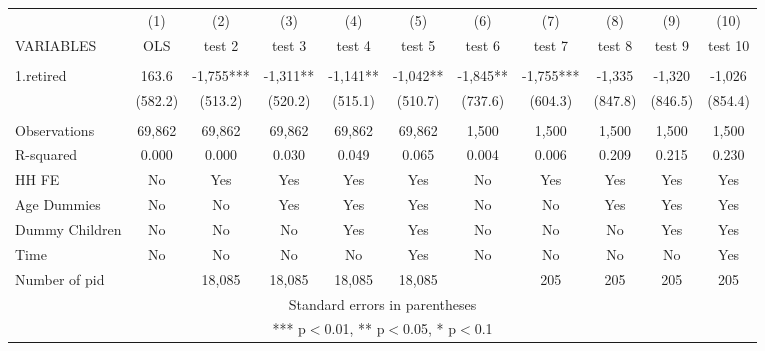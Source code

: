 \begin{tabular}{lcccccccccc} \hline
 & (1) & (2) & (3) & (4) & (5) & (6) & (7) & (8) & (9) & (10) \\
VARIABLES & OLS & test 2 & test 3 & test 4 & test 5 & test 6 & test 7 & test 8 & test 9 & test 10 \\ \hline
 &  &  &  &  &  &  &  &  &  &  \\
1.retired & 163.6 & -1,755*** & -1,311** & -1,141** & -1,042** & -1,845** & -1,755*** & -1,335 & -1,320 & -1,026 \\
 & (582.2) & (513.2) & (520.2) & (515.1) & (510.7) & (737.6) & (604.3) & (847.8) & (846.5) & (854.4) \\
 &  &  &  &  &  &  &  &  &  &  \\
Observations & 69,862 & 69,862 & 69,862 & 69,862 & 69,862 & 1,500 & 1,500 & 1,500 & 1,500 & 1,500 \\
R-squared & 0.000 & 0.000 & 0.030 & 0.049 & 0.065 & 0.004 & 0.006 & 0.209 & 0.215 & 0.230 \\
HH FE & No & Yes & Yes & Yes & Yes & No & Yes & Yes & Yes & Yes \\
Age Dummies & No & No & Yes & Yes & Yes & No & No & Yes & Yes & Yes \\
Dummy Children & No & No & No & Yes & Yes & No & No & No & Yes & Yes \\
Time & No & No & No & No & Yes & No & No & No & No & Yes \\
 Number of pid &  & 18,085 & 18,085 & 18,085 & 18,085 &  & 205 & 205 & 205 & 205 \\ \hline
\multicolumn{11}{c}{ Standard errors in parentheses} \\
\multicolumn{11}{c}{ *** p$<$0.01, ** p$<$0.05, * p$<$0.1} \\
\end{tabular}
